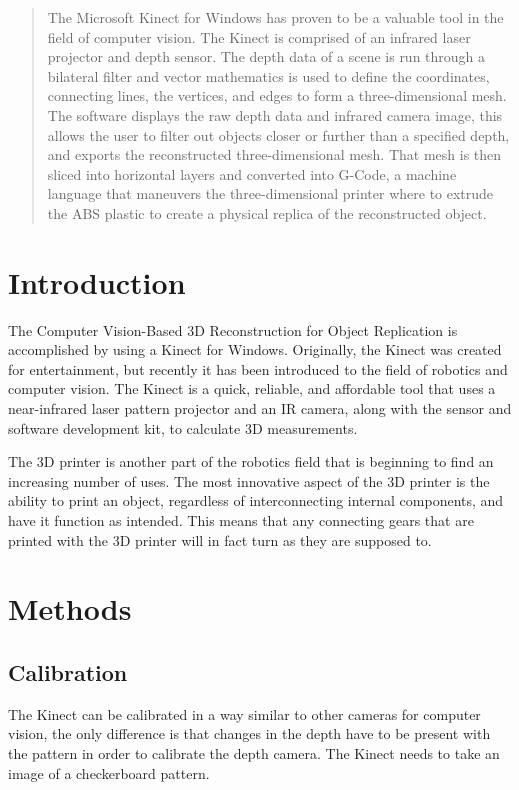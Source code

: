 \documentclass[pdftex,10.5pt]{report}
\begin{document}


\begin{abstract}
The Microsoft Kinect for Windows has proven to be a valuable tool in the field of computer vision. The Kinect is comprised of an infrared laser projector and depth sensor. The depth data of a scene is run through a bilateral filter and vector mathematics is used to define the coordinates, connecting lines, the vertices, and edges to form a three-dimensional mesh. The software displays the raw depth data and infrared camera image, this allows the user to filter out objects closer or further than a specified depth, and exports the reconstructed three-dimensional mesh. That mesh is then sliced into horizontal layers and converted into G-Code, a machine language that maneuvers the three-dimensional printer where to extrude the ABS plastic to create a physical replica of the reconstructed object. 
\end{abstract}
\tableofcontents



\section{Introduction}
The Computer Vision-Based 3D Reconstruction for Object Replication is accomplished by using a Kinect for Windows. Originally, the Kinect was created for entertainment, but recently it has been introduced to the field of robotics and computer vision. The Kinect is a quick, reliable, and affordable tool that uses a near-infrared laser pattern projector and an IR camera, along with the sensor and software development kit, to calculate 3D measurements.

The 3D printer is another part of the robotics field that is beginning to find an increasing number of uses. The most innovative aspect of the 3D printer is the ability to print an object, regardless of interconnecting internal components, and have it function as intended. This means that any connecting gears that are printed with the 3D printer will in fact turn as they are supposed to.

\section{Methods}
\subsection{Calibration}
The Kinect can be calibrated in a way similar to other cameras for computer vision, the only difference is that changes in the depth have to be present  with the pattern in order to calibrate the depth camera. The Kinect needs to take an image of a checkerboard pattern.
\end{document}
